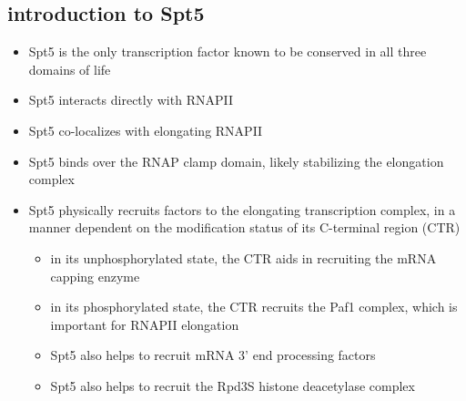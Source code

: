 \documentclass[9pt, letterpaper]{article}
\begin{document}
\subsection{introduction to Spt5}

\begin{itemize}[nosep, topsep=.5em]
\item Spt5 is the only transcription factor known to be conserved in all three domains of life
\item Spt5 interacts directly with RNAPII
\item Spt5 co-localizes with elongating RNAPII
\item Spt5 binds over the RNAP clamp domain, likely stabilizing the elongation complex
\item Spt5 physically recruits factors to the elongating transcription complex, in a manner dependent on the modification status of its C-terminal region (CTR)
    \begin{itemize}[nosep]
        \item in its unphosphorylated state, the CTR aids in recruiting the mRNA capping enzyme
        \item in its phosphorylated state, the CTR recruits the Paf1 complex, which is important for RNAPII elongation
        \item Spt5 also helps to recruit mRNA 3' end processing factors
        \item Spt5 also helps to recruit the Rpd3S histone deacetylase complex
    \end{itemize}
\end{itemize}

{}

\end{document}
